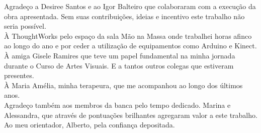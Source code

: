 \begin{agradecimento}

Agradeço a Desiree Santos e ao Igor Balteiro que colaboraram com a execução da obra apresentada. Sem suas contribuições, ideias e incentivo este trabalho não seria possível.\\

À ThoughtWorks pelo espaço da sala Mão na Massa onde trabalhei horas afinco  ao longo do ano e por ceder a utilização de equipamentos como Arduino e Kinect.\\

À amiga Gisele Ramires que teve um papel fundamental na minha jornada durante o Curso de Artes Visuais. E a tantos outros colegas que estiveram presentes.\\


À Maria Amélia, minha terapeura, que me acompanhou ao longo dos últimos anos.\\

Agradeço também aos membros da banca pelo tempo dedicado. Marina e Alessandra, que através de pontuações brilhantes agregaram valor a este trabalho. \\


Ao meu orientador, Alberto, pela confiança depositada.\\

\end{agradecimento}